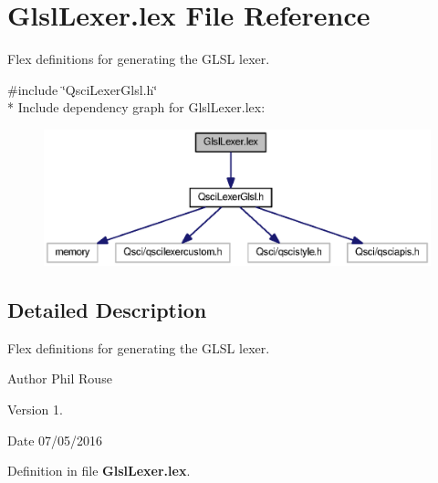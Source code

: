 \section{Glsl\-Lexer.\-lex File Reference}
\label{_glsl_lexer_8lex}


Flex definitions for generating the G\-L\-S\-L lexer.  


{\ttfamily \#include \char`\"{}Qsci\-Lexer\-Glsl.\-h\char`\"{}}\\*
Include dependency graph for Glsl\-Lexer.\-lex\-:\nopagebreak
\begin{figure}[H]
\begin{center}
\leavevmode
\includegraphics[width=350pt]{_glsl_lexer_8lex__incl}
\end{center}
\end{figure}


\subsection{Detailed Description}
Flex definitions for generating the G\-L\-S\-L lexer. \begin{DoxyAuthor}{Author}
Phil Rouse 
\end{DoxyAuthor}
\begin{DoxyVersion}{Version}
1. 
\end{DoxyVersion}
\begin{DoxyDate}{Date}
07/05/2016 
\end{DoxyDate}


Definition in file {\bf Glsl\-Lexer.\-lex}.

